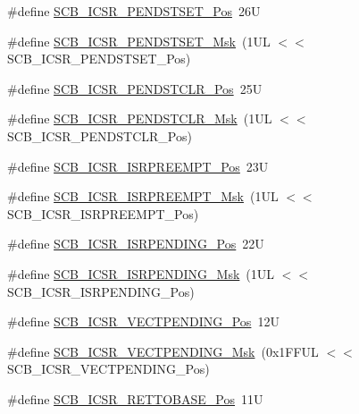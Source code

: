 \begin{DoxyCompactItemize}
\item 
\#define \hyperlink{group___c_m_s_i_s___s_c_b_ga9dbb3358c6167c9c3f85661b90fb2794}{S\+C\+B\+\_\+\+I\+C\+S\+R\+\_\+\+P\+E\+N\+D\+S\+T\+S\+E\+T\+\_\+\+Pos}~26U
\item 
\#define \hyperlink{group___c_m_s_i_s___s_c_b_ga7325b61ea0ec323ef2d5c893b112e546}{S\+C\+B\+\_\+\+I\+C\+S\+R\+\_\+\+P\+E\+N\+D\+S\+T\+S\+E\+T\+\_\+\+Msk}~(1\+U\+L $<$$<$ S\+C\+B\+\_\+\+I\+C\+S\+R\+\_\+\+P\+E\+N\+D\+S\+T\+S\+E\+T\+\_\+\+Pos)
\item 
\#define \hyperlink{group___c_m_s_i_s___s_c_b_gadbe25e4b333ece1341beb1a740168fdc}{S\+C\+B\+\_\+\+I\+C\+S\+R\+\_\+\+P\+E\+N\+D\+S\+T\+C\+L\+R\+\_\+\+Pos}~25U
\item 
\#define \hyperlink{group___c_m_s_i_s___s_c_b_gab241827d2a793269d8cd99b9b28c2157}{S\+C\+B\+\_\+\+I\+C\+S\+R\+\_\+\+P\+E\+N\+D\+S\+T\+C\+L\+R\+\_\+\+Msk}~(1\+U\+L $<$$<$ S\+C\+B\+\_\+\+I\+C\+S\+R\+\_\+\+P\+E\+N\+D\+S\+T\+C\+L\+R\+\_\+\+Pos)
\item 
\#define \hyperlink{group___c_m_s_i_s___s_c_b_ga11cb5b1f9ce167b81f31787a77e575df}{S\+C\+B\+\_\+\+I\+C\+S\+R\+\_\+\+I\+S\+R\+P\+R\+E\+E\+M\+P\+T\+\_\+\+Pos}~23U
\item 
\#define \hyperlink{group___c_m_s_i_s___s_c_b_gaa966600396290808d596fe96e92ca2b5}{S\+C\+B\+\_\+\+I\+C\+S\+R\+\_\+\+I\+S\+R\+P\+R\+E\+E\+M\+P\+T\+\_\+\+Msk}~(1\+U\+L $<$$<$ S\+C\+B\+\_\+\+I\+C\+S\+R\+\_\+\+I\+S\+R\+P\+R\+E\+E\+M\+P\+T\+\_\+\+Pos)
\item 
\#define \hyperlink{group___c_m_s_i_s___s_c_b_ga10749d92b9b744094b845c2eb46d4319}{S\+C\+B\+\_\+\+I\+C\+S\+R\+\_\+\+I\+S\+R\+P\+E\+N\+D\+I\+N\+G\+\_\+\+Pos}~22U
\item 
\#define \hyperlink{group___c_m_s_i_s___s_c_b_ga056d74fd538e5d36d3be1f28d399c877}{S\+C\+B\+\_\+\+I\+C\+S\+R\+\_\+\+I\+S\+R\+P\+E\+N\+D\+I\+N\+G\+\_\+\+Msk}~(1\+U\+L $<$$<$ S\+C\+B\+\_\+\+I\+C\+S\+R\+\_\+\+I\+S\+R\+P\+E\+N\+D\+I\+N\+G\+\_\+\+Pos)
\item 
\#define \hyperlink{group___c_m_s_i_s___s_c_b_gada60c92bf88d6fd21a8f49efa4a127b8}{S\+C\+B\+\_\+\+I\+C\+S\+R\+\_\+\+V\+E\+C\+T\+P\+E\+N\+D\+I\+N\+G\+\_\+\+Pos}~12U
\item 
\#define \hyperlink{group___c_m_s_i_s___s_c_b_gacb6992e7c7ddc27a370f62878a21ef72}{S\+C\+B\+\_\+\+I\+C\+S\+R\+\_\+\+V\+E\+C\+T\+P\+E\+N\+D\+I\+N\+G\+\_\+\+Msk}~(0x1\+F\+F\+U\+L $<$$<$ S\+C\+B\+\_\+\+I\+C\+S\+R\+\_\+\+V\+E\+C\+T\+P\+E\+N\+D\+I\+N\+G\+\_\+\+Pos)
\item 
\#define \hyperlink{group___c_m_s_i_s___s_c_b_ga403d154200242629e6d2764bfc12a7ec}{S\+C\+B\+\_\+\+I\+C\+S\+R\+\_\+\+R\+E\+T\+T\+O\+B\+A\+S\+E\+\_\+\+Pos}~11U
$$
\end{DoxyCompactItemize}
